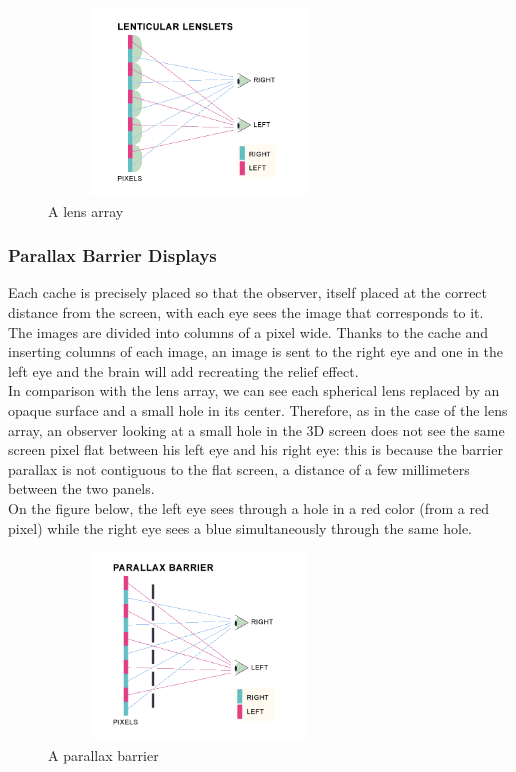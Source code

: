 \begin{figure}[h!]
\begin{center}
\begin{minipage}{1\linewidth}
\centering
\includegraphics[width=8cm,height=5cm]{image/lentuc.png}
\caption{A lens array\cite{glasses-free3D}}
\end{minipage}
\end{center}
\end{figure}

\subsubsection{Parallax Barrier Displays}

Each cache is precisely placed so that the observer, itself placed at the correct distance from the screen, with each eye sees the image that corresponds to it. The images are divided into columns of a pixel wide. Thanks to the cache and inserting columns of each image, an image is sent to the right eye and one in the left eye and the brain will add recreating the relief effect.\\
In comparison with the lens array, we can see each spherical lens replaced by an opaque surface and a small hole in its center. Therefore, as in the case of the lens array, an observer looking at a small hole in the 3D screen does not see the same screen pixel flat between his left eye and his right eye: this is because the barrier parallax is not contiguous to the flat screen, a distance of a few millimeters between the two panels.\\
On the figure below, the left eye sees through a hole in a red color (from a red pixel) while the right eye sees a blue simultaneously through the same hole.
\clearpage

\begin{figure}[h!]
\begin{center}
\begin{minipage}{1\linewidth}
\centering\includegraphics[width=8cm,height=5cm]{image/parallax.png}
\caption{A parallax barrier\cite{glasses-free3D}}
\end{minipage}
\end{center}
\end{figure}

